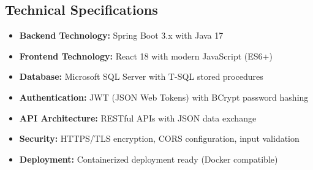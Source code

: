 \documentclass[12pt,a4paper]{article}
\begin{document}
\subsection{Technical Specifications}

\begin{itemize}
    \item \textbf{Backend Technology:} Spring Boot 3.x with Java 17
    \item \textbf{Frontend Technology:} React 18 with modern JavaScript (ES6+)
    \item \textbf{Database:} Microsoft SQL Server with T-SQL stored procedures
    \item \textbf{Authentication:} JWT (JSON Web Tokens) with BCrypt password hashing
    \item \textbf{API Architecture:} RESTful APIs with JSON data exchange
    \item \textbf{Security:} HTTPS/TLS encryption, CORS configuration, input validation
    \item \textbf{Deployment:} Containerized deployment ready (Docker compatible)
\end{itemize}
\end{document}
